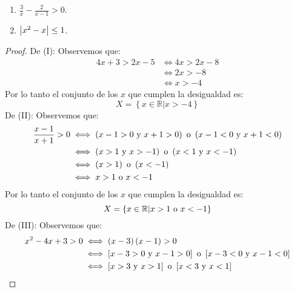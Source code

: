 \documentclass[12pt]{article}
\begin{document}
\begin{enumerate}
\begin{multicols}{2}
\begin{enumerate}
            \item $\frac{3}{x}-\frac{2}{x-1}>0$.
            \item $\left| x^2-x \right|\leq 1$.
        \end{enumerate}
    \end{multicols}
    \begin{proof}
        De (I): Observemos que:
        \begin{equation*}
            \begin{split}
                4x+3 > 2x-5 &\iff 4x > 2x-8 \\
                &\iff 2x > -8\\
                &\iff x>-4
            \end{split}
        \end{equation*}
        Por lo tanto el conjunto de los $x$ que cumplen la desigualdad es: 
        \begin{equation*}
            X = \left\{x\in\mathbb{R}|x>-4\right\}
        \end{equation*}
        De (II): Observemos que:
        \begin{equation*}
            \begin{split}
                \frac{x-1}{x+1}>0 &\iff \left(x-1 > 0 \textup{ y } x+1 > 0\right) \textup{ o } \left(x-1 < 0 \textup{ y } x+1 < 0\right)\\
                &\iff \left(x > 1 \textup{ y } x > -1\right) \textup{ o } \left(x < 1 \textup{ y } x < -1\right) \\
                &\iff \left(x > 1\right) \textup{ o } \left(x < -1\right) \\
                &\iff x>1 \textup{ o }x < -1
            \end{split}
        \end{equation*}
        Por lo tanto el conjunto de los $x$ que cumplen la desigualdad es: 
        \begin{equation*}
            X = \left\{x\in\mathbb{R}|x>1 \textup{ o } x < -1\right\}
        \end{equation*}
        De (III): Observemos que:
        \begin{equation*}
            \begin{split}
                x^2-4x+3>0 &\iff \left(x-3\right)\left(x-1\right)>0\\
                &\iff \left[x-3 > 0 \textup{ y } x-1 > 0\right] \textup{ o } \left[x-3 < 0 \textup{ y } x-1 < 0\right] \\
                &\iff \left[x > 3 \textup{ y } x > 1\right] \textup{ o } \left[x < 3 \textup{ y } x < 1\right] \\

\end{split}
\end{equation*}
\end{proof}
\end{enumerate}
\end{document}
